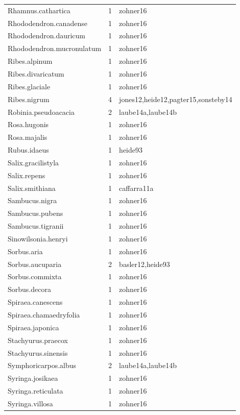\documentclass{article}
\begin{document}
\begin{footnotesize}
\begin{longtable}{|p{}|p{}|p{}|}
  Rhamnus.cathartica &   1 & zohner16 \\ 
  Rhododendron.canadense &   1 & zohner16 \\ 
  Rhododendron.dauricum &   1 & zohner16 \\ 
  Rhododendron.mucronulatum &   1 & zohner16 \\ 
  Ribes.alpinum &   1 & zohner16 \\ 
  Ribes.divaricatum &   1 & zohner16 \\ 
  Ribes.glaciale &   1 & zohner16 \\ 
  Ribes.nigrum &   4 & jones12,heide12,pagter15,sonsteby14 \\ 
  Robinia.pseudoacacia &   2 & laube14a,laube14b \\ 
  Rosa.hugonis &   1 & zohner16 \\ 
  Rosa.majalis &   1 & zohner16 \\ 
  Rubus.idaeus &   1 & heide93 \\ 
  Salix.gracilistyla &   1 & zohner16 \\ 
  Salix.repens &   1 & zohner16 \\ 
  Salix.smithiana &   1 & caffarra11a \\ 
  Sambucus.nigra &   1 & zohner16 \\ 
  Sambucus.pubens &   1 & zohner16 \\ 
  Sambucus.tigranii &   1 & zohner16 \\ 
  Sinowilsonia.henryi &   1 & zohner16 \\ 
  Sorbus.aria &   1 & zohner16 \\ 
  Sorbus.aucuparia &   2 & basler12,heide93 \\ 
  Sorbus.commixta &   1 & zohner16 \\ 
  Sorbus.decora &   1 & zohner16 \\ 
  Spiraea.canescens &   1 & zohner16 \\ 
  Spiraea.chamaedryfolia &   1 & zohner16 \\ 
  Spiraea.japonica &   1 & zohner16 \\ 
  Stachyurus.praecox &   1 & zohner16 \\ 
  Stachyurus.sinensis &   1 & zohner16 \\ 
  Symphoricarpos.albus &   2 & laube14a,laube14b \\ 
  Syringa.josikaea &   1 & zohner16 \\ 
  Syringa.reticulata &   1 & zohner16 \\ 
  Syringa.villosa &   1 & zohner16 \\ 

\end{longtable}
\end{footnotesize}
\end{document}
